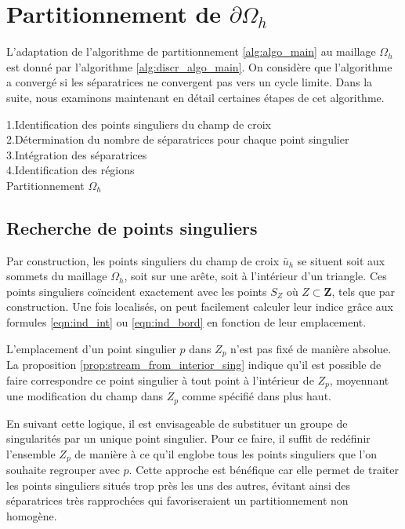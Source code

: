 \section{Partitionnement de $\partial\Omega_h$}
\label{sec:partitionnement_omega_h}

L'adaptation de l'algorithme de partitionnement \ref{alg:algo_main} au maillage $\Omega_h$ est donné par l'algorithme \ref{alg:discr_algo_main}. On considère que l'algorithme a convergé si les séparatrices ne convergent pas vers un cycle limite. Dans la suite, nous examinons maintenant en détail certaines étapes de cet algorithme.

\begin{algorithm}[h!]
\renewcommand{\algorithmcfname}{Algorithme}%
\SetAlgoLined
{}
\vspace{0.2cm}
1.\quad Identification des points singuliers du champ de croix\\[0.2cm]
2.\quad Détermination du nombre de séparatrices pour chaque point singulier\\[0.2cm]
3.\quad Intégration des séparatrices\\[0.2cm]
4.\quad Identification des régions\\[0.2cm]
\caption{Partitionnement $\Omega_h$}
\label{alg:discr_algo_main}
\end{algorithm}

\subsection{Recherche de points singuliers}

Par construction, les points singuliers du champ de croix $\bar{u}_h$ se situent soit aux sommets du maillage $\Omega_h$, soit sur une arête, soit à l'intérieur d'un triangle. Ces points singuliers coïncident exactement avec les points $S_Z$ où $Z\subset\mathbf{Z}$, tels que par construction. Une fois localisés, on peut facilement calculer leur indice grâce aux formules \ref{eqn:ind_int} ou \ref{eqn:ind_bord} en fonction de leur emplacement.

\begin{remark}
L'emplacement d'un point singulier $p$ dans $Z_p$ n'est pas fixé de manière absolue. La proposition \ref{prop:stream_from_interior_sing} indique qu'il est possible de faire correspondre ce point singulier à tout point à l'intérieur de $Z_p$, moyennant une modification du champ dans $Z_p$ comme spécifié dans plus haut.

En suivant cette logique, il est envisageable de substituer un groupe de singularités par un unique point singulier. Pour ce faire, il suffit de redéfinir l'ensemble $Z_p$ de manière à ce qu'il englobe tous les points singuliers que l'on souhaite regrouper avec $p$. Cette approche est bénéfique car elle permet de traiter les points singuliers situés trop près les uns des autres, évitant ainsi des séparatrices très rapprochées qui favoriseraient un partitionnement non homogène.
\end{remark}

